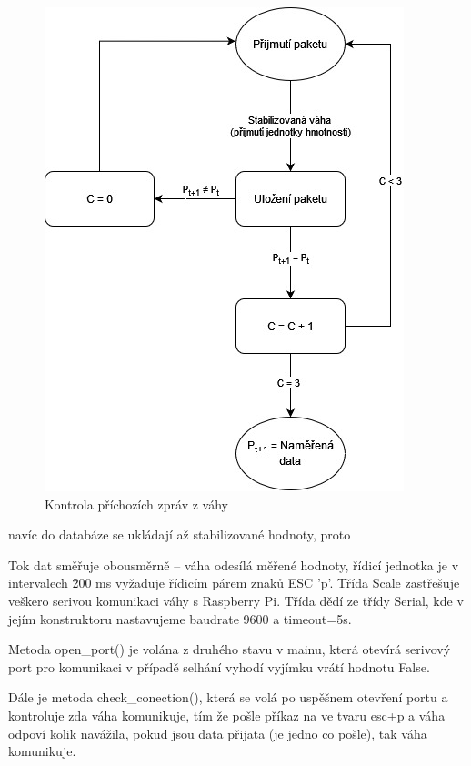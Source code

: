 \begin{figure}[H]
    \begin{center}
        \includegraphics[scale=0.6]{obrazky/stavovy_automat_parita.jpg}
    \end{center}
    \caption{Kontrola příchozích zpráv z váhy}
    \label{ošetření parity}
\end{figure}


navíc do databáze se ukládají až stabilizované hodnoty, proto




Tok dat směřuje obousměrně – váha odesílá měřené hodnoty, řídicí jednotka je v intervalech \~200 ms vyžaduje řídicím párem znaků ESC 'p'. Třída Scale zastřešuje veškero serivou komunikaci váhy s Raspberry Pi. Třída dědí ze třídy Serial, kde v jejím konstruktoru nastavujeme baudrate 9600 a timeout=5s. 

Metoda open\_port() je volána z druhého stavu v mainu, která otevírá serivový port pro komunikaci v případě selhání vyhodí vyjímku vrátí hodnotu False.

Dále je metoda check\_conection(), která se volá po uspěšnem otevření portu a kontroluje zda váha komunikuje, tím že pošle příkaz na ve tvaru esc+p a váha odpoví kolik navážila, pokud jsou data přijata (je jedno co pošle), tak váha komunikuje.


